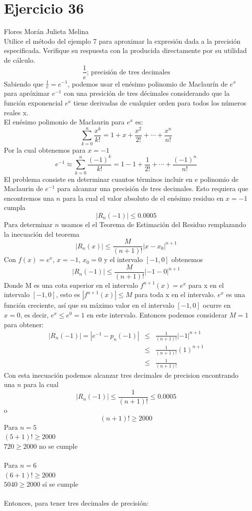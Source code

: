 \documentclass[12pt]{article}
\begin{document}
\section{Ejercicio 36} Flores Morán Julieta Melina \\

Utilice el método del ejemplo 7 para aproximar la expresión dada a la precisión especificada. Verifique su respuesta con la producida directamente por su utilidad de cálculo.
\[\frac{1}{e}\text{; precisión de tres decimales}\]
Sabiendo que $ \frac{1}{e} = e^{-1} $, podemos usar el enésimo polinomio de Maclaurín de $e^{x}$ para apróximar $e^{-1}$ con una presición de tres décimales considerando que la función exponencial $e^{x}$ tiene derivadas de cualquier orden para todos los números reales x.\\
El enésimo polimonio de Maclaurin para $e^x$ es:
\[
\sum_{k=0}^{n}\frac{x^{k}}{k!} = 1 + x + \frac{x^{2}}{2!}+ \cdots + \frac{x^{n}}{n!}
\]
Por la cual obtenemos para $x = -1$
\[
e^{-1} \approx \sum_{k=0}^{n}\frac{(-1)^{k}}{k!} = 1 - 1 + \frac{1}{2!}+ \cdots + \frac{(-1)^{n}}{n!}
\]
El problema consiste en determinar cuantos términos incluir en e polinomio de Maclaurin de $e^{-1}$ para alcanzar una precisión de tres decimales. Esto requiera que encontremos una $n$ para la cual el valor absoluto de el enésimo residuo en $x = -1$ cumpla
\[
\left| R_n (-1) \right| \leq 0.0005
\]
Para determinar $n$ usamos el el Teorema de Estimación del Residuo 
remplazando la inecuación del teorema 
\[
\left| R_n (x)  \right|  \leq \frac{M}{(n+1)!} \left| x-x_0  \right|^{n+1}
\]
Con $f(x) = e ^{x}$, $x = -1$, $x_0 = 0$ y el intervalo $[-1, 0]$ obtenemos
\[
\left| R_n (-1)  \right|  \leq \frac{M}{(n+1)!} \left| -1-0  \right|^{n+1}
\]
Donde M es una cota superior en el intervalo $f^{n+1}(x) = e^{x}$ para x en el intervalo $[-1, 0]$, esto es $\left|f^{n+1}(x)\right| \leq M$ para toda  x en el intervalo. $e^x$ es una función creciente, así que su máximo valor en el intervalo $[-1, 0]$ ocurre en $x=0$, es decir, $e^{x} \leq e^{0} =1$ en este intervalo. Entonces podemos considerar $M = 1$ para obtener:
\begin{eqnarray}
\left| R_n (-1)  \right| = \left| e^{-1}- p_n(-1)  \right|
&\leq & \frac{1}{(n+1)!} \left| -1\right|^{n+1} \nonumber
\\
&\leq & \frac{1}{(n+1)!} (1)^{n+1} \nonumber
\\
&\leq & \frac{1}{(n+1)!}  \nonumber
\end{eqnarray}
Con esta inecuación podemos alcanzar tres decimales de precision encontrando una $n$ para la cual
\[
\left| R_n (-1)  \right|  \leq  \frac{1}{(n+1)!} \leq 0.0005
\]
o
\[
(n+1)! \geq 2000
\]
Para $n = 5$ \\
$(5+1)! \geq 2000$ \\
$720 \geq  2000$ no se cumple \\ \\
Para $n = 6$ \\
$(6+1)! \geq 2000$ \\
$ 5040 \geq  2000$ sí se cumple \\ \\
Entonces, para tener tres decimales de precisión:
\end{document}
